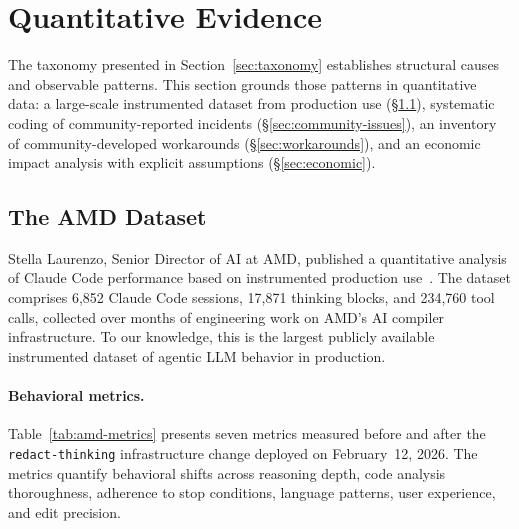 \section{Quantitative Evidence}
\label{sec:evidence}

The taxonomy presented in Section~\ref{sec:taxonomy} establishes structural causes and observable patterns.
This section grounds those patterns in quantitative data: a large-scale instrumented dataset from production use (\S\ref{sec:amd}), systematic coding of community-reported incidents (\S\ref{sec:community-issues}), an inventory of community-developed workarounds (\S\ref{sec:workarounds}), and an economic impact analysis with explicit assumptions (\S\ref{sec:economic}).


\subsection{The AMD Dataset}
\label{sec:amd}

Stella Laurenzo, Senior Director of AI at AMD, published a quantitative analysis of Claude Code performance based on instrumented production use~\cite{laurenzo2026amd}.
The dataset comprises 6,852 Claude Code sessions, 17,871 thinking blocks, and 234,760 tool calls, collected over months of engineering work on AMD's AI compiler infrastructure.
To our knowledge, this is the largest publicly available instrumented dataset of agentic LLM behavior in production.

\paragraph{Behavioral metrics.}
Table~\ref{tab:amd-metrics} presents seven metrics measured before and after the \texttt{redact-thinking} infrastructure change deployed on February~12, 2026.
The metrics quantify behavioral shifts across reasoning depth, code analysis thoroughness, adherence to stop conditions, language patterns, user experience, and edit precision.

